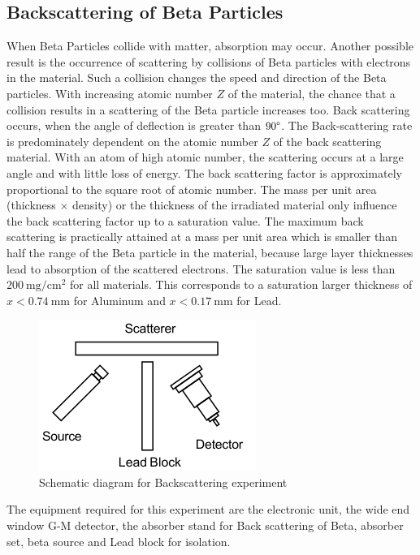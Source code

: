 \documentclass[%
 reprint,
nofootinbib,
 amsmath,amssymb,
 aps,
floatfix,
]{revtex4-2}
\begin{document}
    \subsection{Backscattering of Beta Particles}
        When Beta Particles collide with matter, absorption may occur. Another possible result is the occurrence of scattering by collisions of Beta particles with electrons in the material. Such a collision changes the speed and direction of the Beta particles. With increasing atomic number $Z$ of the material, the chance that a collision results in a scattering of the Beta particle increases too. Back scattering occurs, when the angle of deflection is greater than $90 \degree$. The Back-scattering rate is predominately dependent on the atomic number $Z$ of the back scattering material. With an atom of high atomic number, the scattering occurs at a large angle and with little loss of energy. The back scattering factor is approximately proportional to the square root of atomic number. The mass per unit area (thickness $\times$ density) or the thickness of the irradiated material only influence the back scattering factor up to a saturation value. The maximum back scattering is practically attained at a mass per unit area which is smaller than half the range of the Beta particle in the material, because large layer thicknesses lead to absorption of the scattered electrons. The saturation value is less than $\SI{200}{\milli \gram \per \centi \metre \squared}$ for all materials. This corresponds to a saturation larger thickness of $x < \SI{0.74}{\milli \metre}$ for Aluminum and $x < \SI{0.17}{\milli \metre}$ for Lead.
        \begin{figure}
            \centering
            \includegraphics{Figures/bacscattSCHEMATIC.png}
            \caption{Schematic diagram for Backscattering experiment}
            \label{fig:bacscattschematic}
        \end{figure}
        \par
        The equipment required for this experiment are the electronic unit, the wide end window G-M detector, the absorber stand for Back scattering of Beta, absorber set, beta source and Lead block for isolation.
\end{document}
